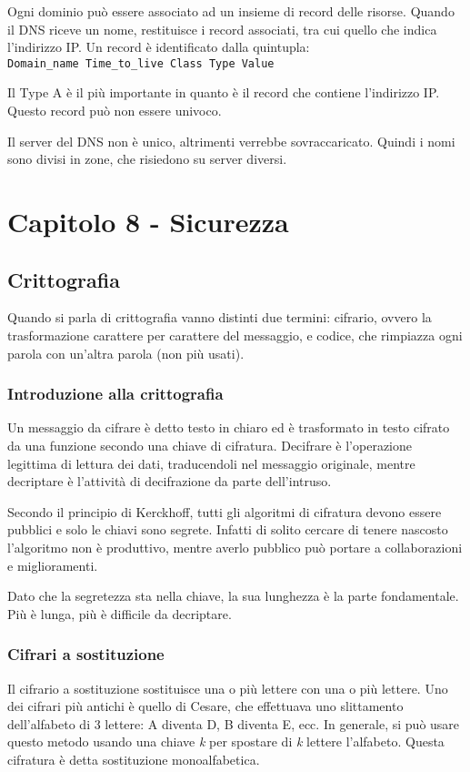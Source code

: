 Ogni dominio può essere associato ad un insieme di record delle risorse.
Quando il DNS riceve un nome, restituisce i record associati, tra cui quello che indica l'indirizzo IP.
Un record è identificato dalla quintupla:\\
\texttt{Domain\_name Time\_to\_live Class Type Value}

Il Type A è il più importante in quanto è il record che contiene l'indirizzo IP. Questo record può non essere univoco.

Il server del DNS non è unico, altrimenti verrebbe sovraccaricato. Quindi i nomi sono divisi in zone, che risiedono su server diversi. 

\newpage
\section{Capitolo 8 - Sicurezza}

\subsection{Crittografia} %
Quando si parla di crittografia vanno distinti due termini: cifrario, ovvero la trasformazione carattere per carattere del messaggio, e codice, che rimpiazza ogni parola con un'altra parola (non più usati).

\subsubsection{Introduzione alla crittografia}
Un messaggio da cifrare è detto testo in chiaro ed è trasformato in testo cifrato da una funzione secondo una chiave di cifratura.
Decifrare è l'operazione legittima di lettura dei dati, traducendoli nel messaggio originale, mentre decriptare è l'attività di decifrazione da parte dell'intruso.

Secondo il principio di Kerckhoff, tutti gli algoritmi di cifratura devono essere pubblici e solo le chiavi sono segrete.
Infatti di solito cercare di tenere nascosto l'algoritmo non è produttivo, mentre averlo pubblico può portare a collaborazioni e miglioramenti.

Dato che la segretezza sta nella chiave, la sua lunghezza è la parte fondamentale.
Più è lunga, più è difficile da decriptare.

\subsubsection{Cifrari a sostituzione}
Il cifrario a sostituzione sostituisce una o più lettere con una o più lettere.
Uno dei cifrari più antichi è quello di Cesare, che effettuava uno slittamento dell'alfabeto di 3 lettere: A diventa D, B diventa E, ecc.
In generale, si può usare questo metodo usando una chiave \textit{k} per spostare di \textit{k} lettere l'alfabeto.
Questa cifratura è detta sostituzione monoalfabetica.

